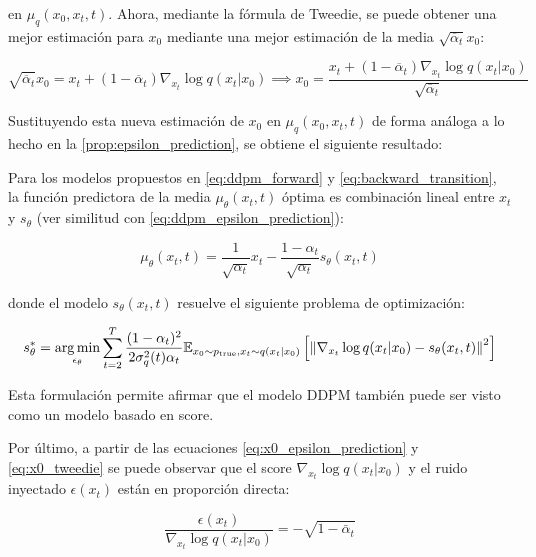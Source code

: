 en $\mu_q(x_0,x_t,t)$. Ahora, mediante la fórmula de Tweedie, se puede obtener una mejor estimación para $x_0$ mediante una mejor estimación de la media $\sqrt{\overline{\alpha}_t}x_0$:

\begin{equation}
    \label{eq:x0_tweedie}
    \sqrt{\overline{\alpha}_t}x_0 = x_t+(1-\overline{\alpha}_t)\nabla_{x_t}\log q(x_t|x_0) \implies x_0 = \frac{x_t+(1-\overline{\alpha}_t)\nabla_{x_t}\log q(x_t|x_0)}{\sqrt{\overline{\alpha}_t}}
\end{equation}

Sustituyendo esta nueva estimación de $x_0$ en $\mu_q(x_0,x_t,t)$ de forma análoga a lo hecho en la \autoref{prop:epsilon_prediction}, se obtiene el siguiente resultado:

\begin{prop}
    \label{prop:score_prediction}
    Para los modelos propuestos en \eqref{eq:ddpm_forward} y \eqref{eq:backward_transition}, la función predictora de la media $\mu_\theta(x_t,t)$ óptima es combinación lineal entre $x_t$ y $s_\theta$ (ver similitud con \eqref{eq:ddpm_epsilon_prediction}):

    \begin{equation}
        \mu_\theta(x_t,t) = \frac{1}{\sqrt{\alpha_t}}x_t - \frac{1-\alpha_t}{\sqrt{\alpha_t}}s_\theta(x_t,t)
    \end{equation}

    donde el modelo $s_\theta(x_t,t)$ resuelve el siguiente problema de optimización:

    \begin{equation}
        s_\theta^*=\operatorname*{arg\,min}_{\epsilon_\theta} \sum_{t=2}^T \frac{(1-\alpha_t)^2}{2\sigma_q^2(t)\alpha_t} \mathbb{E}_{x_0\sim p_{\operatorname{true}}, x_t\sim q(x_t|x_0)}\left[\left\lVert \nabla_{x_t}\log q(x_t|x_0) - s_\theta(x_t,t) \right\rVert^2\right]
    \end{equation}
\end{prop}

Esta formulación permite afirmar que el modelo DDPM también puede ser visto como un modelo basado en score.

Por último, a partir de las ecuaciones \eqref{eq:x0_epsilon_prediction} y \eqref{eq:x0_tweedie} se puede observar que el score $\nabla_{x_t}\log q(x_t|x_0)$ y el ruido inyectado $\epsilon(x_t)$ están en proporción directa:

\begin{equation}
    \frac{\epsilon(x_t)}{\nabla_{x_t}\log q(x_t|x_0)} = -\sqrt{1-\bar\alpha_t}
\end{equation}

